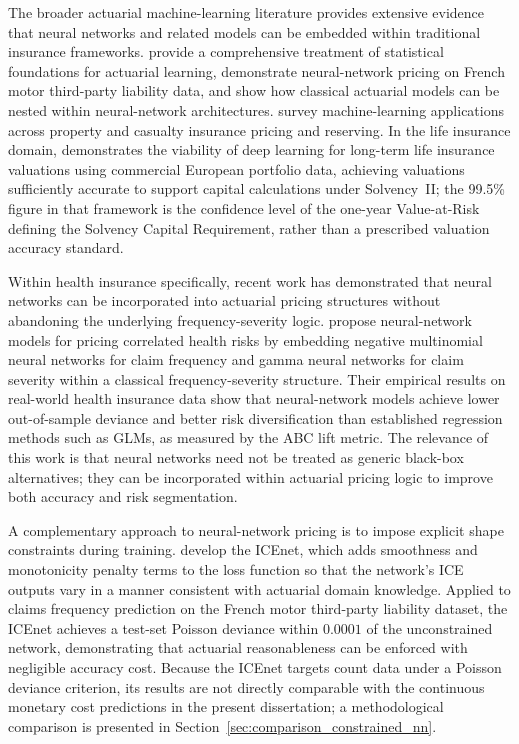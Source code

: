 \noindent
The broader actuarial machine-learning literature provides extensive evidence
that neural networks and related models can be embedded within traditional
insurance frameworks.  \citet{wuthrich2023statistical} provide a comprehensive
treatment of statistical foundations for actuarial learning,
\citet{noll2020case} demonstrate neural-network pricing on French motor
third-party liability data, and \citet{schelldorfer2019nesting} show how
classical actuarial models can be nested within neural-network architectures.
\citet{blierwong2021machine} survey machine-learning applications across
property and casualty insurance pricing and reserving.  In the life insurance
domain, \citet{blomerus2025longterm} demonstrates the viability of deep
learning for long-term life insurance valuations using commercial European
portfolio data, achieving valuations sufficiently accurate to support
capital calculations under Solvency~II; the 99.5\% figure in that
framework is the confidence level of the one-year Value-at-Risk defining
the Solvency Capital Requirement, rather than a prescribed valuation
accuracy standard.

\noindent
Within health insurance specifically, recent work has demonstrated that neural
networks can be incorporated into actuarial pricing structures without
abandoning the underlying frequency-severity logic.
\citet{laporta2025neural} propose neural-network models for pricing correlated
health risks by embedding negative multinomial
neural networks for claim frequency and gamma neural networks for claim
severity within a classical frequency-severity structure. Their empirical
results on real-world health insurance data show that neural-network models
achieve lower out-of-sample deviance and better risk diversification than
established regression methods such as GLMs, as measured
by the ABC lift metric. The relevance of this work is that neural networks need
not be treated as generic black-box alternatives; they can be incorporated
within actuarial pricing logic to improve both accuracy and risk segmentation.

\noindent
A complementary approach to neural-network pricing is to impose explicit shape
constraints during training.  \citet{richman2024icenet} develop the ICEnet,
which adds smoothness and monotonicity penalty terms to the loss function so
that the network's ICE outputs vary in a manner
consistent with actuarial domain knowledge.  Applied to claims frequency
prediction on the French motor third-party liability dataset, the ICEnet
achieves a test-set Poisson deviance within $0.0001$ of the unconstrained
network, demonstrating that actuarial reasonableness can be enforced with
negligible accuracy cost.  Because the ICEnet targets count data under a
Poisson deviance criterion, its results are not directly comparable with the
continuous monetary cost predictions in the present dissertation; a
methodological comparison is presented in
Section~\ref{sec:comparison_constrained_nn}.


